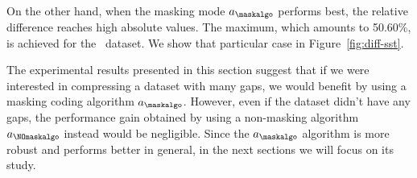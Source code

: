 \clearpage





\clearpage


On the other hand, when the masking mode $a_\maskalgo$ performs best, the relative difference reaches high absolute values. The maximum, which amounts to 50.60\%, is achieved for the \datasetsst \ dataset. We show that particular case in Figure~\ref{fig:diff-sst}.


The experimental results presented in this section suggest that if we were interested in compressing a dataset with many gaps, we would benefit by using a masking coding algorithm $a_\maskalgo$. However, even if the dataset didn't have any gaps, the performance gain obtained by using a non-masking algorithm $a_\NOmaskalgo$ instead would be negligible. Since the $a_\maskalgo$ algorithm is more robust and performs better in general, in the next sections we will focus on its study.
